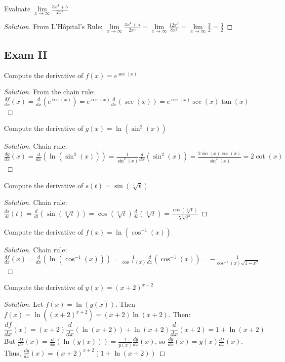 \documentclass[crop=false,class=book,oneside]{standalone}
\begin{document}
\begin{problem}
Evaluate $\underset{x\rightarrow\infty}{\lim}\frac{3x^{4}+5}{2x^{4}}$
\end{problem}
\begin{proof}[Solution]
From L'H\^{o}pital's Rule: $\underset{x\rightarrow\infty}{\lim}\frac{3x^{4}+5}{2x^{4}}=\underset{x\rightarrow\infty}{\lim}\frac{12x^{3}}{8x^{3}}=\underset{x\rightarrow \infty}{\lim}\frac{3}{2}=\frac{3}{2}$
\end{proof}
\subsection{Exam II}
\begin{problem}
Compute the derivative of $f(x)=e^{\sec(x)}$
\end{problem}
\begin{proof}[Solution]
From the chain rule: $\frac{df}{dx}(x)=\frac{d}{dx}(e^{\sec(x)})=e^{\sec(x)}\frac{d}{dx}(\sec(x))=e^{\sec(x)}\sec(x)\tan(x)$
\end{proof}
\begin{problem}
Compute the derivative of $g(x)=\ln(\sin^{2}(x))$
\end{problem}
\begin{proof}[Solution]
Chain rule: $\frac{dg}{dx}(x)=\frac{d}{dx}(\ln(\sin^{2}(x)))=\frac{1}{\sin^{2}(x)}\frac{d}{dx}(\sin^{2}(x))=\frac{2\sin(x)\cos(x)}{\sin^{2}(x)}=2\cot(x)$
\end{proof}
\begin{problem}
Compute the derivative of $s(t)=\sin(\sqrt[5]{t})$
\end{problem}
\begin{proof}[Solution]
Chain rule: $\frac{ds}{dt}(t)=\frac{d}{dt}(\sin(\sqrt[5]{t}))=\cos(\sqrt[5]{t})\frac{d}{dt}(\sqrt[5]{t})=\frac{\cos(\sqrt[5]{t})}{5\sqrt[5]{t^{4}}}$
\end{proof}
\begin{problem}
Compute the derivative of $f(x)=\ln(\cos^{-1}(x))$
\end{problem}
\begin{proof}[Solution]
Chain rule: $\frac{df}{dx}(x)=\frac{d}{dx}(\ln(\cos^{-1}(x)))=\frac{1}{\cos^{-1}(x)}\frac{d}{dx}(\cos^{-1}(x))=-\frac{1}{\cos^{-1}(x)\sqrt{1-x^{2}}}$
\end{proof}
\begin{problem}
Compute the derivative of $y(x)=(x+2)^{x+2}$
\end{problem}
\begin{proof}[Solution]
Let $f(x)=\ln(y(x))$. Then $f(x)=\ln((x+2)^{x+2})=(x+2)\ln(x+2)$. Then:
\begin{equation*}
    \frac{df}{dx}(x)=(x+2)\frac{d}{dx}(\ln(x+2))+\ln(x+2)\frac{d}{dx}(x+2)=1+\ln(x+2)
\end{equation*}
But $\frac{df}{dx}(x)=\frac{d}{dx}(\ln(y(x)))=\frac{1}{y(x)}\frac{dy}{dx}(x)$, so $\frac{dy}{dx}(x)=y(x)\frac{df}{dx}(x)$. Thus, $\frac{dy}{dx}(x)=(x+2)^{x+2}(1+\ln(x+2))$
\end{proof}
\end{document}
